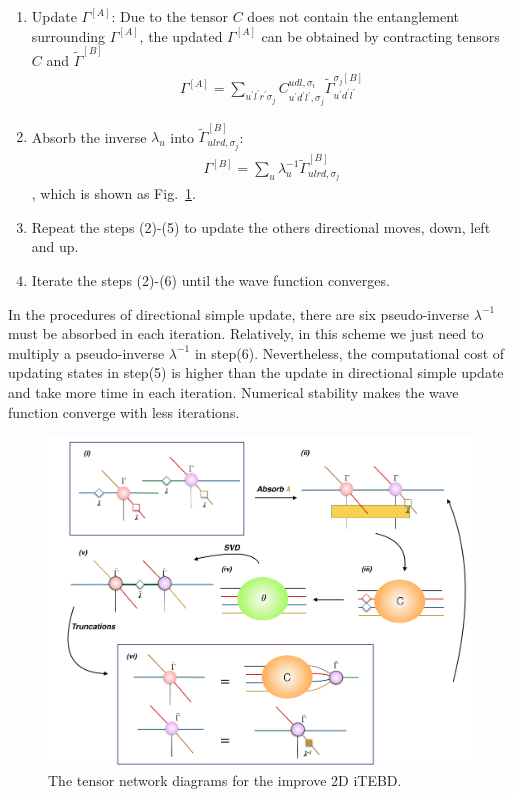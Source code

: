 \begin{enumerate}
		\item Update $\Gamma^{[A]}$: Due to the tensor $C$ does not contain the entanglement surrounding $\Gamma^{[A]}$, the updated $\Gamma^{[A]}$ can be obtained by contracting tensors $C$ and $\widetilde{\Gamma}^{[B]}$
			\begin{align}
				\Gamma^{[A]} = \sum_{u^{\prime}l^{\prime}r^{\prime}\sigma_j}{C^{udl,\sigma_i}_{u^{\prime}d^{\prime}l^{\prime},\sigma_j} \widetilde{\Gamma}^{\sigma_j [B]}_{u^{\prime}d^{\prime}l^{\prime}}}
			\end{align}
		\item Absorb the inverse $\lambda_{u}$ into $\widetilde{\Gamma}^{[B]}_{ulrd,\sigma_j}$:
			\begin{align}
				\Gamma^{[B]} = \sum_{u}{\lambda_{u}^{-1}\widetilde{\Gamma}^{[B]}_{ulrd,\sigma_j}}
			\end{align}
			, which is shown as Fig.~\ref{fig318}.
		\item Repeat the steps (2)-(5) to update the others directional moves, down, left and up.  
		\item Iterate the steps (2)-(6) until the wave function converges.
\end{enumerate}

In the procedures of directional simple update, there are six pseudo-inverse $\lambda^{-1}$ must be absorbed in each iteration. Relatively, in this scheme we just need to multiply a pseudo-inverse $\lambda^{-1}$ in step(6). Nevertheless, the computational cost of updating states in step(5) is higher than the update in directional simple update and take more time in each iteration. Numerical stability makes the wave function converge with less iterations.

\begin{figure}[ht]
	\centering
	\includegraphics[width=1.00\textwidth]{figures/fig317.png}
	\caption[The tensor network diagrams for the 2D iTEBD with QR decomposition]{The tensor network diagrams for the improve 2D iTEBD.}
	\label{fig318}
\end{figure}

